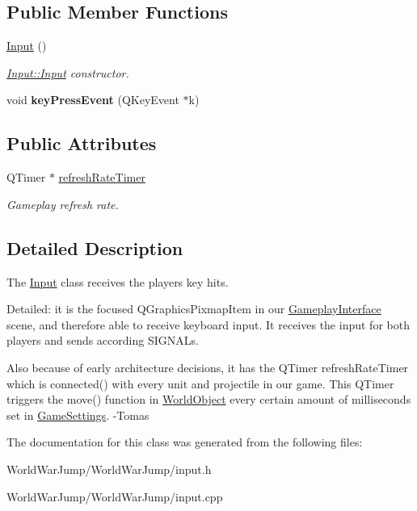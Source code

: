 \subsection*{Public Member Functions}
\begin{DoxyCompactItemize}
\item 
\hyperlink{class_input_abae3f379d3f157cf42dc857309832dba}{Input} ()\hypertarget{class_input_abae3f379d3f157cf42dc857309832dba}{}\label{class_input_abae3f379d3f157cf42dc857309832dba}

\begin{DoxyCompactList}\small\item\em \hyperlink{class_input_abae3f379d3f157cf42dc857309832dba}{Input\+::\+Input} constructor. \end{DoxyCompactList}\item 
void {\bfseries key\+Press\+Event} (Q\+Key\+Event $\ast$k)\hypertarget{class_input_af33a8e4ba483419bd40b1c20ccc1cd7f}{}\label{class_input_af33a8e4ba483419bd40b1c20ccc1cd7f}

\end{DoxyCompactItemize}
\subsection*{Public Attributes}
\begin{DoxyCompactItemize}
\item 
Q\+Timer $\ast$ \hyperlink{class_input_a3196d6cd66f0491bc90fd7a48e2d9c9c}{refresh\+Rate\+Timer}\hypertarget{class_input_a3196d6cd66f0491bc90fd7a48e2d9c9c}{}\label{class_input_a3196d6cd66f0491bc90fd7a48e2d9c9c}

\begin{DoxyCompactList}\small\item\em Gameplay refresh rate. \end{DoxyCompactList}\end{DoxyCompactItemize}


\subsection{Detailed Description}
The \hyperlink{class_input}{Input} class receives the players\textquotesingle{} key hits. 

Detailed\+: it is the focused Q\+Graphics\+Pixmap\+Item in our \hyperlink{class_gameplay_interface}{Gameplay\+Interface} scene, and therefore able to receive keyboard input. It receives the input for both players and sends according S\+I\+G\+N\+A\+Ls.

Also because of early architecture decisions, it has the Q\+Timer refresh\+Rate\+Timer which is connected() with every unit and projectile in our game. This Q\+Timer triggers the move() function in \hyperlink{class_world_object}{World\+Object} every certain amount of milliseconds set in \hyperlink{class_game_settings}{Game\+Settings}. -\/\+Tomas 

The documentation for this class was generated from the following files\+:\begin{DoxyCompactItemize}
\item 
World\+War\+Jump/\+World\+War\+Jump/input.\+h\item 
World\+War\+Jump/\+World\+War\+Jump/input.\+cpp\end{DoxyCompactItemize}
